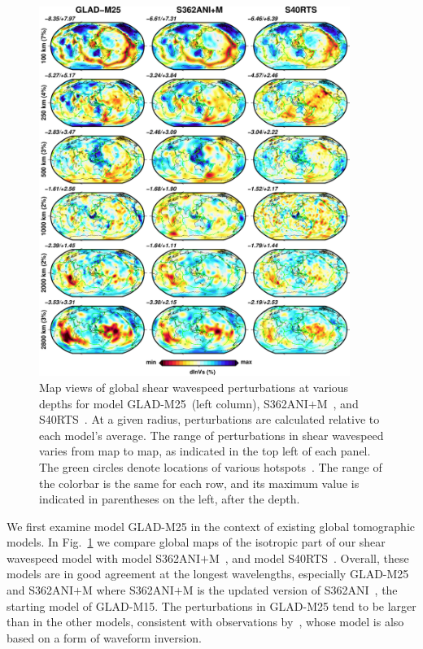 \documentclass[extra,mreferee]{gji}
\begin{document}
\begin{figure}
  \centering
  \includegraphics[width=0.9\textwidth]{figures/depth_slice/globe_vs.pdf}
  \caption{\small{Map views of global shear wavespeed perturbations at various depths for  model
  GLAD-M25~(left column), S362ANI$+$M~\citep[middle column;][]{moulik2014anisotropic},
  and S40RTS~\citep[right column;][]{ritsema2011s40rts}.
  At a given radius,
  perturbations are calculated relative to each model's average.
  The range of perturbations in shear wavespeed varies from map to map, as indicated in the top left of each panel.
  The green circles denote locations of various
  hotspots~\citep{montelli2006catalogue}.
  The range of the colorbar is the same for each row,
  and its maximum value is indicated in parentheses on the left, after
  the depth.}}
  \label{fig:global-vs}
\end{figure}

We first examine model GLAD-M25 in the context of existing global tomographic models.
In Fig.~\ref{fig:global-vs} we compare global maps of the isotropic part of our
shear wavespeed model with model S362ANI$+$M~\citep{moulik2014anisotropic},
and model S40RTS~\citep{ritsema2011s40rts}.
Overall, these models are in good agreement
at the longest wavelengths, especially GLAD-M25 and S362ANI$+$M where S362ANI$+$M is the updated version of S362ANI~\citep{s362ani}, the starting model of GLAD-M15.
The perturbations in GLAD-M25 tend to be larger than in the other models,
consistent with observations by~\cite{french2014whole,french2015broad},
whose model is also based on a form of waveform inversion.
\end{document}
